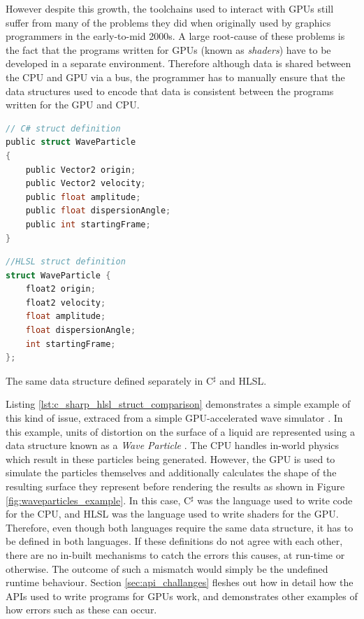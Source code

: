 \documentclass[a4paper,12pt,twoside,openright]{report}
\begin{document}
However despite this growth, the toolchains used to interact with GPUs still
suffer from many of the problems they did when originally used by graphics
programmers in the early-to-mid 2000s. A large root-cause of these problems is
the fact that the programs written for GPUs (known as \textit{shaders}) have to
be developed in a separate environment. Therefore although data is shared
between the CPU and GPU via a bus, the programmer has to manually ensure that
the data structures used to encode that data is consistent between the programs
written for the GPU and CPU.

\begin{lstfloat}
\begin{lstlisting}[language=C]
// C# struct definition
public struct WaveParticle
{
    public Vector2 origin;
    public Vector2 velocity;
    public float amplitude;
    public float dispersionAngle;
    public int startingFrame;
}
\end{lstlisting}
\begin{lstlisting}[language=C]
//HLSL struct definition
struct WaveParticle {
    float2 origin;
    float2 velocity;
    float amplitude;
    float dispersionAngle;
    int startingFrame;
};
\end{lstlisting}
\label{lst:c_sharp_hlsl_struct_comparison}
\caption{The same data structure defined separately in C$^\sharp$ and HLSL.}
\end{lstfloat}

Listing \ref{lst:c_sharp_hlsl_struct_comparison} demonstrates a simple example
of this kind of issue, extraced from a simple GPU-accelerated wave simulator
\cite{WaveParticlesGPU}. In this example, units of distortion on the surface of
a liquid are represented using a data structure known as a \textit{Wave
Particle} \cite{WaveParticlesOriginalPaper}. The CPU handles in-world physics
which result in these particles being generated. However, the GPU is used to
simulate the particles themselves and additionally calculates the shape of the
resulting surface they represent before rendering the results as shown in
Figure \ref{fig:waveparticles_example}. In this case, C$^\sharp$ was the
language used to write code for the CPU, and HLSL was the language used to
write shaders for the GPU. Therefore, even though both languages require the
same data structure, it has to be defined in both languages. If these
definitions do not agree with each other, there are no in-built mechanisms to
catch the errors this causes, at run-time or otherwise. The outcome of such a
mismatch would simply be the undefined runtime behaviour. Section
\ref{sec:api_challanges} fleshes out how in detail how the APIs used to write
programs for GPUs work, and demonstrates other examples of how errors such as
these can occur.
\end{document}
